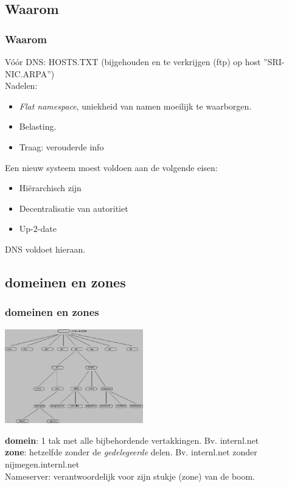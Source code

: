 \subsection{Waarom}
\begin{styleframe}
	\frametitle{Waarom}
V\'o\'or DNS: HOSTS.TXT (bijgehouden en te verkrijgen (ftp) op host ''SRI-NIC.ARPA'')\\
\pause
Nadelen:
\begin{itemize}
	\item {\it Flat namespace}, uniekheid van namen moeilijk te waarborgen.
	\item Belasting.
	\item Traag: verouderde info
\end{itemize}
\pause
Een nieuw systeem moest voldoen aan de volgende eisen:
\begin{itemize}
	\item Hi\"erarchisch zijn
	\item Decentralisatie van autoritiet
	\item Up-2-date
\end{itemize}
\pause
DNS voldoet hieraan.
\end{styleframe}

\subsection{domeinen en zones}
\begin{styleframe}
	\frametitle{domeinen en zones}
\begin{center}
\includegraphics[width=6cm]{img/dnshierarchie.png}\\
\end{center}
\pause
{\bf domein}: 1 tak met alle bijbehordende vertakkingen. Bv. internl.net\\
\pause
{\bf zone}: hetzelfde zonder de {\it gedelegeerde} delen. Bv. internl.net zonder nijmegen.internl.net\\
Nameserver: verantwoordelijk voor zijn stukje (zone) van de boom.
\end{styleframe}

